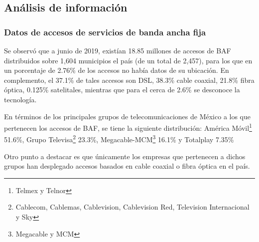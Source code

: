 \documentclass[9pt,twocolumn,twoside]{ilcss}
\begin{document}
\subsection{Análisis de información}

\subsubsection{Datos de accesos de servicios de banda ancha fija}
Se observó que a junio de 2019, existían 18.85 millones de accesos de BAF distribuidos sobre 1,604 municipios el país (de un total de 2,457), para los que en un porcentaje de 2.76\% de los accesos no había datos de su ubicación. En complemento, el 37.1\% de tales accesos son DSL, 38.3\% cable coaxial, 21.8\% fibra óptica, 0.125\% satelitales, mientras que para el cerca de 2.6\% se desconoce la tecnología.

En términos de los principales grupos de telecomunicaciones de México a los que pertenecen los accesos de BAF, se tiene la siguiente distribución: América Móvil\footnote{Telmex y Telnor}  51.6\%, Grupo Televisa\footnote{Cablecom, Cablemas, Cablevision, Cablevision Red, Television Internacional y Sky} 23.3\%, Megacable-MCM\footnote{Megacable y MCM}  16.1\% y Totalplay 7.35\%  

Otro punto a destacar es que únicamente los empresas que pertenecen a dichos grupos han desplegado accesos basados en cable coaxial o fibra óptica en el país.%
%
\end{document}
